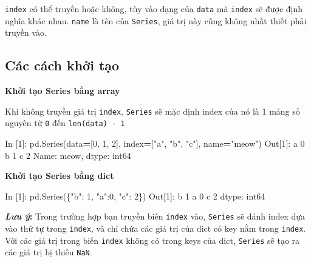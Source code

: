 \documentclass[
]{book}
\makeatletter
\newenvironment{Shaded}{\begin{snugshade}}{\end{snugshade}}
\newcommand{\DecValTok}[1]{\textcolor[rgb]{0.00,0.00,0.81}{#1}}
\newcommand{\NormalTok}[1]{#1}
\newcommand{\OperatorTok}[1]{\textcolor[rgb]{0.81,0.36,0.00}{\textbf{#1}}}
\newcommand{\StringTok}[1]{\textcolor[rgb]{0.31,0.60,0.02}{#1}}
\newenvironment{kframe}{%
\medskip{}
\setlength{\fboxsep}{.8em}
 \def\at@end@of@kframe{}%
 \ifinner\ifhmode%
  \def\at@end@of@kframe{\end{minipage}}%
  \begin{minipage}{\columnwidth}%
 \fi\fi%
 \def\FrameCommand##1{\hskip\@totalleftmargin \hskip-\fboxsep
 \colorbox{shadecolor}{##1}\hskip-\fboxsep
     \hskip-\linewidth \hskip-\@totalleftmargin \hskip\columnwidth}%
 \MakeFramed {\advance\hsize-\width
   \@totalleftmargin\z@ \linewidth\hsize
   \@setminipage}}%
 {\par\unskip\endMakeFramed%
 \at@end@of@kframe}
\newenvironment{rmdblock}[1]
  {
  \begin{itemize}
  \renewcommand{\labelitemi}{
    \raisebox{-.7\height}[0pt][0pt]{
      {\setkeys{Gin}{width=3em,keepaspectratio}\texttt{[image: images/\#1]}}
    }
  }
  \setlength{\fboxsep}{1em}
  \begin{kframe}
  \item
  }
  {
  \end{kframe}
  \end{itemize}
  }
\newenvironment{rmdnote}
  {\begin{rmdblock}{note}}
  {\end{rmdblock}}
\makeatother
\begin{document}
\texttt{index} có thể truyền hoặc không, tùy vào dạng của \texttt{data} mà \texttt{index} sẽ được định nghĩa khác nhau.
\texttt{name} là tên của \texttt{Series}, giá trị này cũng không nhất thiết phải truyền vào.

\subsection{Các cách khởi tạo}\label{cuxe1c-cuxe1ch-khux1edfi-tux1ea1o}

\textbf{Khởi tạo Series bằng array}

Khi không truyền giá trị \texttt{index}, \texttt{Series} sẽ mặc định index của nó là 1 mảng số nguyên từ \texttt{0} đến \texttt{len(data)\ -\ 1}

\begin{Shaded}
\begin{Highlighting}[]
\NormalTok{In [}\DecValTok{1}\NormalTok{]: pd.Series(data}\OperatorTok{=}\NormalTok{[}\DecValTok{0}\NormalTok{, }\DecValTok{1}\NormalTok{, }\DecValTok{2}\NormalTok{], index}\OperatorTok{=}\NormalTok{[}\StringTok{"a"}\NormalTok{, }\StringTok{"b"}\NormalTok{, }\StringTok{"c"}\NormalTok{], name}\OperatorTok{=}\StringTok{"meow"}\NormalTok{)}
\NormalTok{Out[}\DecValTok{1}\NormalTok{]:}
\NormalTok{a    }\DecValTok{0}
\NormalTok{b    }\DecValTok{1}
\NormalTok{c    }\DecValTok{2}
\NormalTok{Name: meow, dtype: int64}
\end{Highlighting}
\end{Shaded}

\textbf{Khởi tạo Series bằng dict}

\begin{Shaded}
\begin{Highlighting}[]
\NormalTok{In [}\DecValTok{1}\NormalTok{]: pd.Series(\{}\StringTok{"b"}\NormalTok{: }\DecValTok{1}\NormalTok{, }\StringTok{"a"}\NormalTok{:}\DecValTok{0}\NormalTok{, }\StringTok{"c"}\NormalTok{: }\DecValTok{2}\NormalTok{\})}
\NormalTok{Out[}\DecValTok{1}\NormalTok{]: }
\NormalTok{b    }\DecValTok{1}
\NormalTok{a    }\DecValTok{0}
\NormalTok{c    }\DecValTok{2}
\NormalTok{dtype: int64}
\end{Highlighting}
\end{Shaded}

\begin{rmdnote}
\textbf{\emph{Lưu ý}:}
Trong trường hợp bạn truyền biến \texttt{index} vào, \texttt{Series} sẽ đánh index dựa vào thứ tự trong \texttt{index}, và chỉ chứa các giá trị của dict có key nằm trong \texttt{index}.
Với các giá trị trong biến \texttt{index} không có trong keys của dict, \texttt{Series} sẽ tạo ra các giá trị bị thiếu \texttt{NaN}.
\end{rmdnote}
\end{document}
